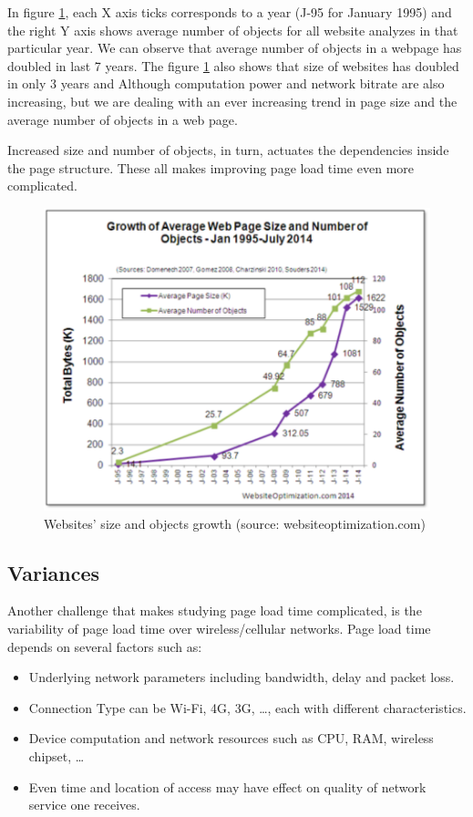 \noindent In figure \ref{fig:websitegrowth}, each X axis ticks corresponds to a year (J-95 for January 1995) and the right Y axis shows average number of objects for all website analyzes in that particular year.
We can observe that average number of objects in a webpage has doubled in last 7 years. 
The figure \ref{fig:websitegrowth} also shows that size of websites has doubled in only 3 years and 
Although computation power and network bitrate are also increasing, but we are dealing with an ever increasing trend in page size and the average number of objects in a web page. \\

\noindent \colorbox{gray!20}{\parbox{0.9\textwidth}{Increased size and number of objects, in turn, actuates the dependencies inside the page structure.
These all makes improving page load time even more complicated.}}

\begin{figure}[!htb]
  \centering
    \includegraphics[width=0.75 \textwidth]{./figures/introduction/websitegrowth.pdf}
  \caption {Websites' size and objects growth (source: websiteoptimization.com)}
  \label{fig:websitegrowth}
\end{figure}
\subsection{Variances}
Another challenge that makes studying page load time complicated, is the variability of page load time over wireless/cellular networks. Page load time depends on several factors such as:
\begin{itemize}
\item Underlying network parameters including bandwidth, delay and packet loss.
\item Connection Type can be Wi-Fi, 4G, 3G, \dots, each with different characteristics.
\item Device computation and network resources such as CPU, RAM, wireless chipset,  \dots
 \item Even time and location of access may have effect on quality of network service one receives.
\end{itemize}

